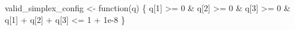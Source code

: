 \documentclass[
  letterpaper,
  DIV=11,
  numbers=noendperiod]{scrartcl}
\newenvironment{Shaded}{\begin{snugshade}}{\end{snugshade}}
\newcommand{\ControlFlowTok}[1]{\textcolor[rgb]{0.00,0.23,0.31}{#1}}
\newcommand{\DecValTok}[1]{\textcolor[rgb]{0.68,0.00,0.00}{#1}}
\newcommand{\FloatTok}[1]{\textcolor[rgb]{0.68,0.00,0.00}{#1}}
\newcommand{\NormalTok}[1]{\textcolor[rgb]{0.00,0.23,0.31}{#1}}
\newcommand{\OtherTok}[1]{\textcolor[rgb]{0.00,0.23,0.31}{#1}}
\newcommand{\SpecialCharTok}[1]{\textcolor[rgb]{0.37,0.37,0.37}{#1}}
\begin{document}
\begin{Shaded}
\begin{Highlighting}[]
\NormalTok{valid\_simplex\_config }\OtherTok{\textless{}{-}} \ControlFlowTok{function}\NormalTok{(q) \{}
\NormalTok{  q[}\DecValTok{1}\NormalTok{] }\SpecialCharTok{\textgreater{}=} \DecValTok{0} \SpecialCharTok{\&}\NormalTok{ q[}\DecValTok{2}\NormalTok{] }\SpecialCharTok{\textgreater{}=} \DecValTok{0} \SpecialCharTok{\&}\NormalTok{ q[}\DecValTok{3}\NormalTok{] }\SpecialCharTok{\textgreater{}=} \DecValTok{0} \SpecialCharTok{\&}\NormalTok{ q[}\DecValTok{1}\NormalTok{] }\SpecialCharTok{+}\NormalTok{ q[}\DecValTok{2}\NormalTok{] }\SpecialCharTok{+}\NormalTok{ q[}\DecValTok{3}\NormalTok{] }\SpecialCharTok{\textless{}=} \DecValTok{1} \SpecialCharTok{+} \FloatTok{1e{-}8}
\NormalTok{\}}
\end{Highlighting}
\end{Shaded}
\end{document}
